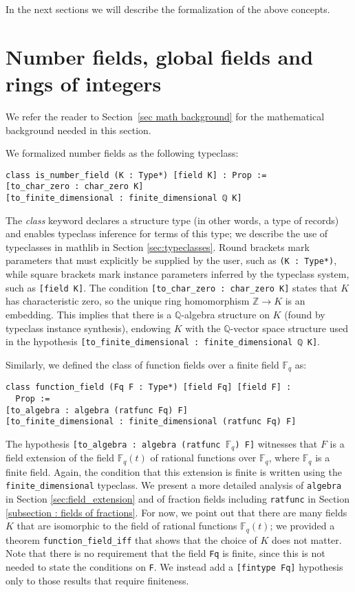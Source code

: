 \documentclass[sn-mathphys]{sn-jnl}%
\newcommand{\lean}[1]{\texttt{#1}\xspace}
\newcommand*{\Fq}[1][q]{\mathbb{F}_{#1}}
\newcommand{\mathlib}{\textsf{mathlib}\xspace}
\newcommand{\QQ}{\mathbb{Q}}
\renewcommand{\Z}{\mathbb{Z}}
\begin{document}
In the next sections we will describe the formalization of the above concepts.

\section{Number fields, global fields and rings of integers} \label{sec:number fields}

We refer the reader to Section~\ref{sec math background} for the mathematical background needed in this section.

We formalized number fields as the following typeclass:
\begin{lstlisting}
class is_number_field (K : Type*) [field K] : Prop :=
[to_char_zero : char_zero K]
[to_finite_dimensional : finite_dimensional ℚ K]
\end{lstlisting}
The \emph{class} keyword declares a structure type (in other words, a type of records) and enables typeclass inference for terms of this type;
we describe the use of typeclasses in \mathlib in Section \ref{sec:typeclasses}.
Round brackets mark parameters that must explicitly be supplied by the user, such as \lean{(K : Type*)}, while
square brackets mark instance parameters inferred by the typeclass system, such as \mbox{\lean{[field K]}}.
The condition \lean{[to\_char\_zero : char\_zero K]} states that $K$ has characteristic zero, so the unique ring homomorphism $\Z \to K$ is an embedding.
This implies that there is a $\QQ$-algebra structure on $K$ (found by typeclass instance synthesis), endowing $K$ with the $\QQ$-vector space structure used in the hypothesis \mbox{\lean{[to\_finite\_dimensional : finite\_dimensional ℚ K]}}.

Similarly, we defined the class of function fields over a finite field $\Fq$ as:
\begin{lstlisting}
class function_field (Fq F : Type*) [field Fq] [field F] :
  Prop :=
[to_algebra : algebra (ratfunc Fq) F]
[to_finite_dimensional : finite_dimensional (ratfunc Fq) F]
\end{lstlisting}
The hypothesis \lean{[to\_algebra : algebra (ratfunc $\Fq$) F]} witnesses that $F$ is a field extension of the field $\Fq[q](t)$ of rational functions over $\Fq[q]$, where $\Fq[q]$ is a finite field.
Again, the condition that this extension is finite is written using the \lean{finite\_dimensional} typeclass.
We present a more detailed analysis of \lean{algebra} in Section \ref{sec:field_extension} and of fraction fields including \lean{ratfunc} in Section \ref{subsection : fields of fractions}.
For now, we point out that there are many fields $K$ that are isomorphic to the field of rational functions $\Fq[q](t)$; we provided a theorem \lean{function\_field\_iff} that shows that the choice of $K$ does not matter.
Note that there is no requirement that the field \lean{Fq} is finite, since this is not needed to state the conditions on \lean{F}.
We instead add a \lean{[fintype Fq]} hypothesis only to those results that require finiteness.
\end{document}
